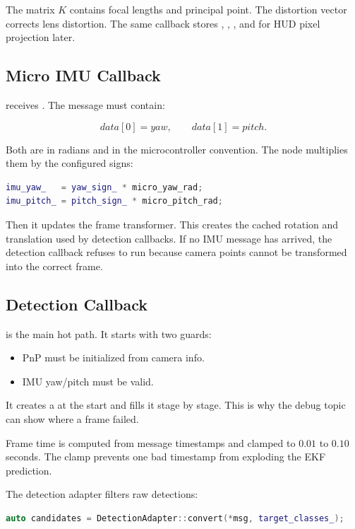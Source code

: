 The matrix $K$ contains focal lengths and principal point. The distortion
vector  corrects lens distortion. The same callback stores
, , , and  for HUD
pixel projection later.

\subsection{Micro IMU Callback}

 receives . The message must contain:

\[
data[0] = yaw,\qquad data[1] = pitch.
\]

Both are in radians and in the microcontroller convention. The node multiplies
them by the configured signs:

\begin{lstlisting}[language=C++]
imu_yaw_   = yaw_sign_ * micro_yaw_rad;
imu_pitch_ = pitch_sign_ * micro_pitch_rad;
\end{lstlisting}

Then it updates the frame transformer. This creates the cached rotation and
translation used by detection callbacks. If no IMU message has arrived, the
detection callback refuses to run because camera points cannot be transformed
into the correct frame.

\subsection{Detection Callback}

 is the main hot path. It starts with two guards:

\begin{itemize}
  \item PnP must be initialized from camera info.
  \item IMU yaw/pitch must be valid.
\end{itemize}

It creates a  at the start and fills it stage by stage. This
is why the debug topic can show where a frame failed.

Frame time  is computed from message timestamps and clamped to
$0.01$ to $0.10$ seconds. The clamp prevents one bad timestamp from exploding
the EKF prediction.

The detection adapter filters raw detections:

\begin{lstlisting}[language=C++]
auto candidates = DetectionAdapter::convert(*msg, target_classes_);
\end{lstlisting}

